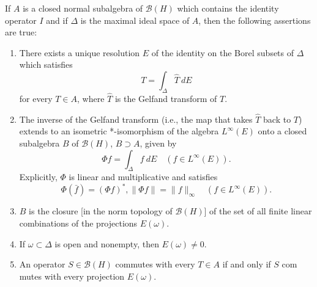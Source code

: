 \begin{theorem}[12.22]
  \label{thm:spectralThm}

  If $A$ is a closed normal subalgebra of $\mathcal{B}(H)$ which contains the identity operator $I$ and if $\Delta$ is the maximal ideal space of $A$, then the following assertions are true:

  \begin{enumerate}
    \item \label{itm:a} There exists a unique resolution $E$ of the identity on the Borel subsets of $\Delta$ which satisfies
          \begin{equation}
            \label{eq:1}
            T = \int_\Delta \widehat{T} \ dE
          \end{equation}
          for every $T \in A$, where $\widehat{T}$ is the Gelfand transform of $T$.
    \item \label{itm:b} The inverse of the Gelfand transform (i.e., the map that takes $\widehat{T}$ back to $T$) extends to an isometric *-isomorphism of the algebra \(L^\infty(E)\) onto a closed subalgebra $B$ of $\mathcal{B}(H)$, $B\supset A$, given by
          \begin{equation}
            \label{eq:2}
            \Phi f = \int_\Delta f \ dE \quad (f \in L^\infty(E)).
          \end{equation}
          Explicitly, $\Phi$ is linear and multiplicative and satisfies
          \[
            \Phi(\bar{f}) = (\Phi f)^*, \| \Phi f \| = \| f \|_{\infty} \quad (f \in L^\infty(E)).
          \]
    \item \label{itm:c}  $B$ is the closure [in the norm topology of  $\mathcal{B}(H)$] of the set of all finite linear combinations of the projections $E(\omega)$.
    \item \label{itm:d}  If $\omega \subset \Delta$ is open and nonempty, then $E(\omega) \neq 0$.
    \item \label{itm:e}  An operator $S \in \mathcal{B}(H)$ commutes with every $T \in A$ if and only if $S$ com mutes with every projection $E(\omega)$.
  \end{enumerate}
\end{theorem}

